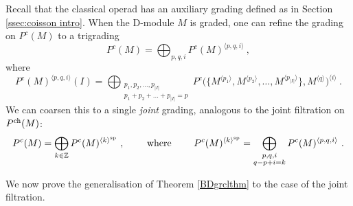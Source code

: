 \documentclass[11pt]{amsart}
\numberwithin{equation}{section}
\theoremstyle{definition}
\newcommand{\spe}{{\textup{sp}}}
\newcommand{\ch}{{\textup{ch}}}
\newcommand{\q}{{\textup{q}}}
\newcommand{\0}{{\textbf{0}}}
\def\IZ{\mathbb{Z}}
\def\ch{{\rm ch}}
\begin{document}
\subsubsection{}

Recall that the classical operad has an auxiliary grading defined as in Section \ref{ssec:coisson intro}. When the D-module $M$ is graded, one can refine the grading on $P^c(M)$ to a trigrading
\[
P^c(M) =\bigoplus_{p,q,i} P^c(M)^{\langle p,q,i\rangle}~,
\]
where
\begin{equation}
	P^c(M)^{\langle{p,q,i\rangle}}(I) =\bigoplus_{\substack{p_1,p_2,\dots,p_{|I|}\\ p_1+p_2+\dots+ p_{|I|} =p}}P^c\big(\{M^{\langle p_1\rangle},M^{\langle p_2\rangle },\dots,M^{\langle p_{|I|} \rangle}\},M^{\langle q\rangle}\big)^{\langle i\rangle}~. 
\end{equation}
We can coarsen this to a single \emph{joint} grading, analogous to the joint filtration on $P^\ch(M)$:
\begin{equation}\label{eq:joint grading on classical}
	P^c(M) = \bigoplus_{k\in \IZ} P^c(M)^{\langle k\rangle^\spe} ~, \qquad \text{ where } \qquad P^c(M)^{\langle k \rangle ^\spe} = \bigoplus_{\substack{p,q,i\\q-p+i=k}}P^c(M)^{\langle p,q,i\rangle}~.
\end{equation}

We now prove the generalisation of Theorem \ref{BDgrclthm} to the case of the joint filtration.
\end{document}
